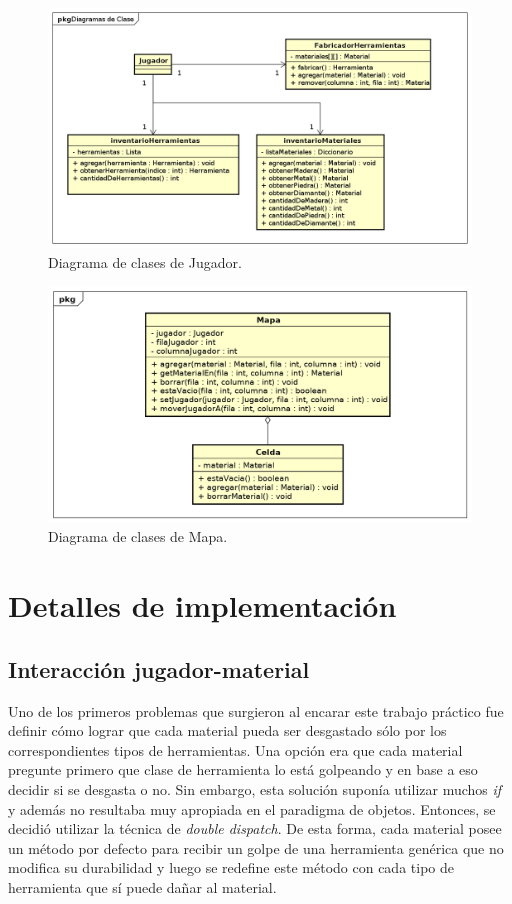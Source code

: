 \documentclass[titlepage,a4paper]{article}
\begin{document}
\begin{figure}[H]
\centering
\includegraphics[width=\textwidth]{Diagramas/Personaje.png}
\caption{\label{fig:jugador}Diagrama de clases de Jugador.}
\end{figure}

\begin{figure}[H]
\centering
\includegraphics[width=\textwidth]{Diagramas/Mapa.png}
\caption{\label{fig:mapa}Diagrama de clases de Mapa.}
\end{figure}

\section{Detalles de implementación}\label{sec:implementacion}
\subsection{Interacción jugador-material}
	Uno de los primeros problemas que surgieron al encarar este trabajo práctico fue definir cómo lograr que cada material pueda ser desgastado sólo por los correspondientes tipos de herramientas. Una opción era que cada material pregunte primero que clase de herramienta lo está golpeando y en base a eso decidir si se desgasta o no. Sin embargo, esta solución suponía utilizar muchos \emph{if} y además no resultaba muy apropiada en el paradigma de objetos. Entonces, se decidió utilizar la técnica de \emph{double dispatch}. De esta forma, cada material posee un método por defecto para recibir un golpe de una herramienta genérica que no modifica su durabilidad y luego se redefine este método con cada tipo de herramienta que sí puede dañar al material.
\end{document}
